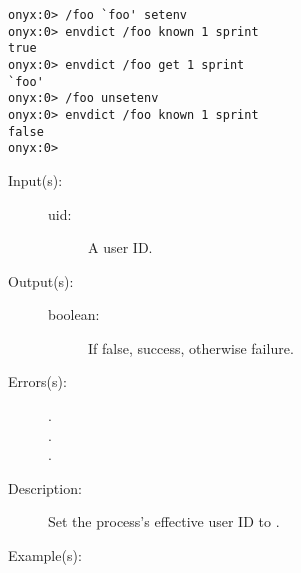 \begin{description}
\begin{description}
\begin{verbatim}
onyx:0> /foo `foo' setenv
onyx:0> envdict /foo known 1 sprint
true
onyx:0> envdict /foo get 1 sprint
`foo'
onyx:0> /foo unsetenv
onyx:0> envdict /foo known 1 sprint
false
onyx:0>
		\end{verbatim}
	\end{description}
\label{systemdict:seteuid}
\item[{\onyxop{uid}{seteuid}{boolean}}: ]
	\begin{description}\item[]
	\item[Input(s): ]
		\begin{description}\item[]
		\item[uid: ]
			A user ID.
		\end{description}
	\item[Output(s): ]
		\begin{description}\item[]
		\item[boolean: ]
			If false, success, otherwise failure.
		\end{description}
	\item[Errors(s): ]
		\begin{description}\item[]
		\item[.]
		\item[.]
		\item[.]
		\end{description}
	\item[Description: ]
		Set the process's effective user ID to .
	\item[Example(s): ]\begin{verbatim}


\end{verbatim}
\end{description}
\end{description}
